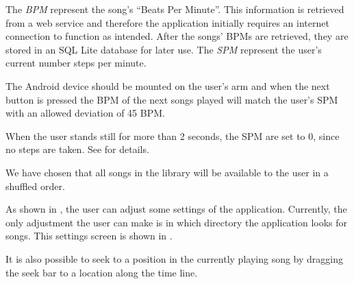 The \textit{BPM} represent the song's ``Beats Per Minute''. This information is retrieved from a web service and therefore the application initially requires an internet connection to function as intended. After the songs' BPMs are retrieved, they are stored in an SQL Lite database for later use. The \textit{SPM} represent the user's current number steps per minute.

The Android device should be mounted on the user's arm and when the next button is pressed the BPM of the next songs played will match the user's SPM with an allowed deviation of 45 BPM.

When the user stands still for more than 2 seconds, the SPM are set to 0, since no steps are taken. See  for details. 

We have chosen that all songs in the library will be  available to the user in a shuffled order.

As shown in , the user can adjust some settings of the application. Currently, the only adjustment the user can make is in which directory the application looks for songs. This settings screen is shown in . 

It is also possible to seek to a position in the currently playing song by dragging the seek bar to a location along the time line. 



